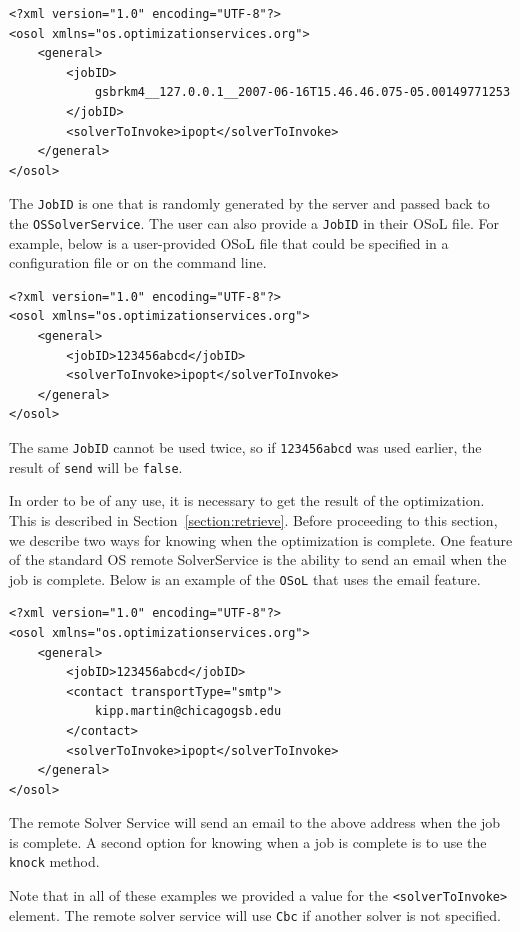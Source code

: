 \documentclass[11pt]{article}
\renewcommand{\_}{{\char"5F}}
\renewcommand{\{}{{\char"7B}}
\renewcommand{\}}{{\char"7D}}
\renewcommand{\^}{{\char"0D}}
\renewcommand{\'}{{\char"0D}}
\begin{document}
\begin{enumerate}[Step 1:]
\begin{verbatim}
<?xml version="1.0" encoding="UTF-8"?>
<osol xmlns="os.optimizationservices.org">
    <general>
        <jobID>
            gsbrkm4__127.0.0.1__2007-06-16T15.46.46.075-05.00149771253
        </jobID>
        <solverToInvoke>ipopt</solverToInvoke>      
    </general>
</osol>
\end{verbatim}

The {\tt JobID} is one that is randomly generated by the server and passed back to the {\tt OSSolverService}.
The user can also provide a {\tt JobID} in their OSoL file. For example, below is a user-provided OSoL file that could
be specified in a configuration file or on the command line.

\begin{verbatim}
<?xml version="1.0" encoding="UTF-8"?>
<osol xmlns="os.optimizationservices.org">
    <general>
        <jobID>123456abcd</jobID>
        <solverToInvoke>ipopt</solverToInvoke>      
    </general>
</osol>
\end{verbatim}

The same {\tt JobID} cannot be used twice, so if {\tt 123456abcd} was used earlier, the result of {\tt send} will be
{\tt false}.

In order to be of any use, it is necessary to get the result of the optimization. This is described in
Section~\ref{section:retrieve}. Before proceeding to this section, we describe two ways for knowing when
the optimization is complete. One feature of the standard OS remote SolverService is the ability to send an
email when the job is complete. Below is an example of the {\tt OSoL} that uses the email feature.

\begin{verbatim}
<?xml version="1.0" encoding="UTF-8"?>
<osol xmlns="os.optimizationservices.org">
    <general>
        <jobID>123456abcd</jobID>
        <contact transportType="smtp">
            kipp.martin@chicagogsb.edu
        </contact>
        <solverToInvoke>ipopt</solverToInvoke>      
    </general>
</osol>
\end{verbatim}

The remote Solver Service will send an email to the above address when the job is complete. A second option for
knowing when a job is complete is to use the {\tt knock} method.

Note that in all of these examples we provided a value for the {\tt <solverToInvoke>} element.
The remote solver service will use {\tt Cbc} if another solver is not specified.%




\end{enumerate}
\end{document}
